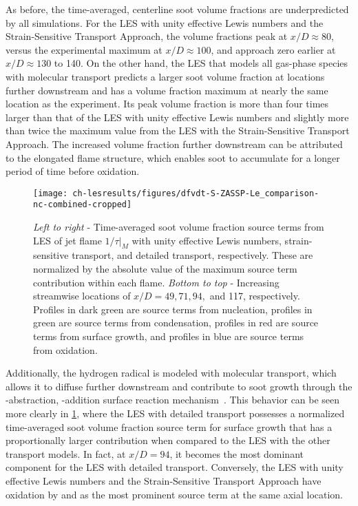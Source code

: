 As before, the time-averaged, centerline soot volume fractions are underpredicted by all simulations. For the LES with unity effective Lewis numbers and the Strain-Sensitive Transport Approach, the volume fractions peak at $x/D \approx 80$, versus the experimental maximum at $x/D \approx 100$, and approach zero earlier at $x/D \approx 130$ to 140. On the other hand, the LES that models all gas-phase species with molecular transport predicts a larger soot volume fraction at locations further downstream and has a volume fraction maximum at nearly the same location as the experiment. Its peak volume fraction is more than four times larger than that of the LES with unity effective Lewis numbers and slightly more than twice the maximum value from the LES with the Strain-Sensitive Transport Approach. The increased volume fraction further downstream can be attributed to the elongated flame structure, which enables soot to accumulate for a longer period of time before oxidation. %

\begin{figure}[H]
  \centering
  \texttt{[image: ch-lesresults/figures/dfvdt-S-ZASSP-Le\_comparison-nc-combined-cropped]}
  \caption[Radial $\langle df_V/dt \rangle/|\langle df_V/dt|_{\text{max}} \rangle|$ from LES with Various Transport Approaches]{\textit{Left to right} - Time-averaged soot volume fraction source terms from LES of jet flame $1/\tau|_M$ with unity effective Lewis numbers, strain-sensitive transport, and detailed transport, respectively. These are normalized by the absolute value of the maximum source term contribution within each flame. \textit{Bottom to top} - Increasing streamwise locations of $x/D = 49, 71, 94,$ and 117, respectively. Profiles in dark green are source terms from nucleation, profiles in green are source terms from condensation, profiles in red are source terms from surface growth, and profiles in blue are source terms from oxidation.}
  \label{fig:lesresults:ssta:radialdfvdtf2lecomparison}
\end{figure}

Additionally, the hydrogen radical is modeled with molecular transport, which allows it to diffuse further downstream and contribute to soot growth through the -abstraction, -addition surface reaction mechanism~\cite{frenklach1985,frenklach1991}. This behavior can be seen more clearly in \cref{fig:lesresults:ssta:radialdfvdtf2lecomparison}, where the LES with detailed transport possesses a normalized time-averaged soot volume fraction source term for surface growth that has a proportionally larger contribution when compared to the LES with the other transport models. In fact, at $x/D = 94$, it becomes the most dominant component for the LES with detailed transport. Conversely, the LES with unity effective Lewis numbers and the Strain-Sensitive Transport Approach have oxidation by  and  as the most prominent source term at the same axial location.

